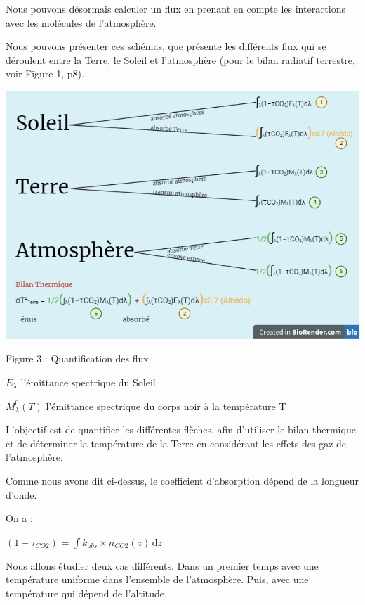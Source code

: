 \documentclass[a4paper, 12pt]{report} %
\begin{document}
Nous pouvons désormais calculer un flux en prenant en compte les interactions avec les molécules de l’atmosphère.

Nous pouvons présenter ces schémas, que présente les différents flux qui se déroulent entre la Terre, le Soleil et l'atmosphère (pour le bilan radiatif terrestre, voir Figure 1, p8).\vspace{\baselineskip}  

\begin{center}
    \includegraphics[scale=0.35]{Images/schemafluxformules.png}

    Figure 3 : Quantification des flux
\end{center} \vspace{\baselineskip}

\noindent $E_\lambda$ l'émittance spectrique du Soleil

\noindent $M^{0}_\lambda (T)$ l'émittance spectrique du corps noir à la température T \vspace{\baselineskip}


L’objectif est de quantifier les différentes flèches, afin d’utiliser le bilan thermique et de déterminer la température de la Terre en considérant les effets des gaz de l’atmosphère.

\noindent Comme nous avons dit ci-dessus, le coefficient d'absorption dépend de la longueur d’onde. 

\noindent On a : 
\begin{center}
    $(1-\tau_{CO2})$ = $\int k_{abs} \times n_{CO2}(z) \, \mathrm{d}z$
\end{center}

Nous allons étudier deux cas différents. Dans un premier temps avec une température uniforme dans l'ensemble de l'atmosphère. Puis, avec une température qui dépend de l'altitude. 
\end{document}
